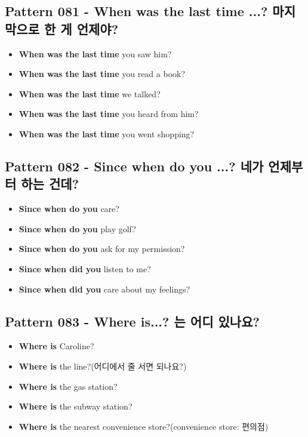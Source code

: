 \documentclass[11pt]{oblivoir}
\begin{document}
\subsection{Pattern 081 - When was the last time ...? 마지막으로 \texttildelow 한 게 언제야?}
\begin{itemize}
  \item \textbf{When was the last time} you saw him?
  \item \textbf{When was the last time} you read a book?
  \item \textbf{When was the last time} we talked?
  \item \textbf{When was the last time} you heard from him?
  \item \textbf{When was the last time} you went shopping?
\end{itemize}

\subsection{Pattern 082 - Since when do you ...? 네가 언제부터 \texttildelow 하는 건데?}
\begin{itemize}
  \item \textbf{Since when do you} care?
  \item \textbf{Since when do you} play golf?
  \item \textbf{Since when do you} ask for my permission?
  \item \textbf{Since when did you} listen to me?
  \item \textbf{Since when did you} care about my feelings?
\end{itemize}

\subsection{Pattern 083 - Where is...? \texttildelow 는 어디 있나요?}
\begin{itemize}
  \item \textbf{Where is} Caroline?
  \item \textbf{Where is} the line?(어디에서 줄 서면 되나요?)
  \item \textbf{Where is} the gas station?
  \item \textbf{Where is} the subway station?
  \item \textbf{Where is} the nearest convenience store?(convenience store: 편의점)
\end{itemize}
\end{document}

